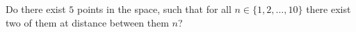 Do there exist $5$ points in the space, such that for all $n\in\{1,2,\ldots,10\}$ there exist two of them at distance between them $n$?